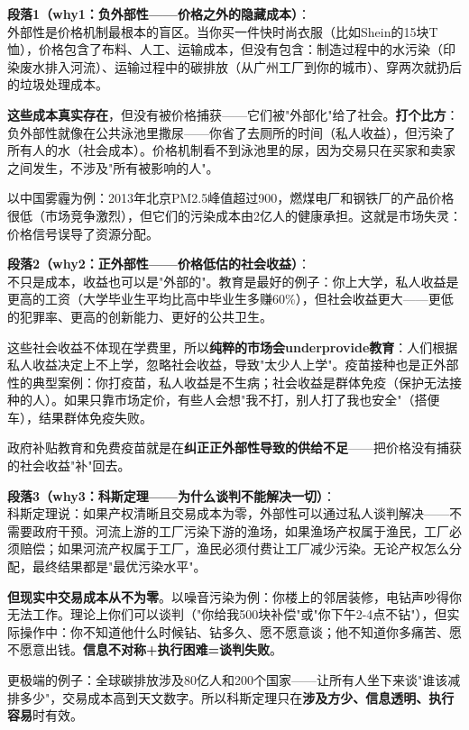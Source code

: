 \documentclass[../main.tex]{subfiles}
\begin{document}
	\textbf{段落1（why1：负外部性——价格之外的隐藏成本）}：\\
	外部性是价格机制最根本的盲区。当你买一件快时尚衣服（比如Shein的15块T恤），价格包含了布料、人工、运输成本，但没有包含：制造过程中的水污染（印染废水排入河流）、运输过程中的碳排放（从广州工厂到你的城市）、穿两次就扔后的垃圾处理成本。

	\textbf{这些成本真实存在}，但没有被价格捕获——它们被"外部化"给了社会。\textbf{打个比方}：负外部性就像在公共泳池里撒尿——你省了去厕所的时间（私人收益），但污染了所有人的水（社会成本）。价格机制看不到泳池里的尿，因为交易只在买家和卖家之间发生，不涉及"所有被影响的人"。

	以中国雾霾为例：2013年北京PM2.5峰值超过900，燃煤电厂和钢铁厂的产品价格很低（市场竞争激烈），但它们的污染成本由2亿人的健康承担。这就是市场失灵：价格信号误导了资源分配。


	\textbf{段落2（why2：正外部性——价格低估的社会收益）}：\\
	不只是成本，收益也可以是"外部的"。教育是最好的例子：你上大学，私人收益是更高的工资（大学毕业生平均比高中毕业生多赚60\%），但社会收益更大——更低的犯罪率、更高的创新能力、更好的公共卫生。

	这些社会收益不体现在学费里，所以\textbf{纯粹的市场会underprovide教育}：人们根据私人收益决定上不上学，忽略社会收益，导致"太少人上学"。疫苗接种也是正外部性的典型案例：你打疫苗，私人收益是不生病；社会收益是群体免疫（保护无法接种的人）。如果只靠市场定价，有些人会想"我不打，别人打了我也安全"（搭便车），结果群体免疫失败。

	政府补贴教育和免费疫苗就是在\textbf{纠正正外部性导致的供给不足}——把价格没有捕获的社会收益"补"回去。


	\textbf{段落3（why3：科斯定理——为什么谈判不能解决一切）}：\\
	科斯定理说：如果产权清晰且交易成本为零，外部性可以通过私人谈判解决——不需要政府干预。河流上游的工厂污染下游的渔场，如果渔场产权属于渔民，工厂必须赔偿；如果河流产权属于工厂，渔民必须付费让工厂减少污染。无论产权怎么分配，最终结果都是"最优污染水平"。

	\textbf{但现实中交易成本从不为零}。以噪音污染为例：你楼上的邻居装修，电钻声吵得你无法工作。理论上你们可以谈判（"你给我500块补偿"或"你下午2-4点不钻"），但实际操作中：你不知道他什么时候钻、钻多久、愿不愿意谈；他不知道你多痛苦、愿不愿意出钱。\textbf{信息不对称+执行困难=谈判失败}。

	更极端的例子：全球碳排放涉及80亿人和200个国家——让所有人坐下来谈"谁该减排多少"，交易成本高到天文数字。所以科斯定理只在\textbf{涉及方少、信息透明、执行容易}时有效。
\end{document}
